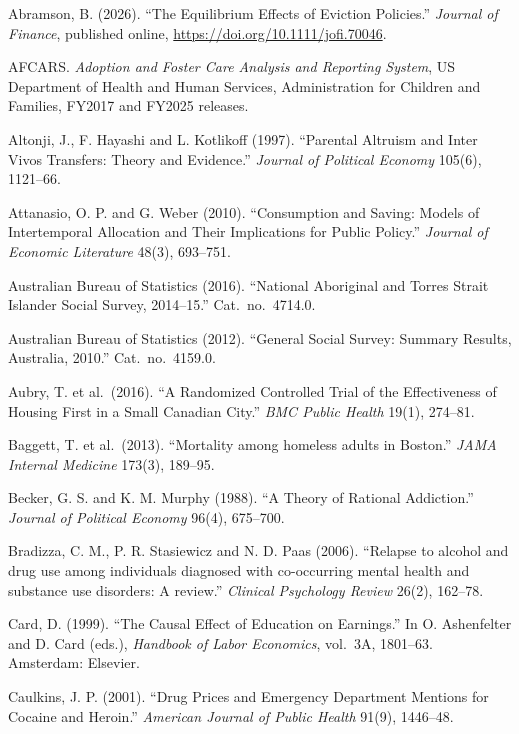 \documentclass[10pt]{article}
\begin{document}
{\normalsize
\setlength{\parindent}{0em}
\begin{list}{}{\setlength{\leftmargin}{1.5em}\setlength{\itemindent}{-1.5em}\setlength{\itemsep}{0.35em}\setlength{\parsep}{0em}}
\item Abramson, B. (2026). ``The Equilibrium Effects of Eviction Policies.'' \emph{Journal of Finance}, published online, \url{https://doi.org/10.1111/jofi.70046}.
\item AFCARS. \emph{Adoption and Foster Care Analysis and Reporting System}, US Department of Health and Human Services, Administration for Children and Families, FY2017 and FY2025 releases.
\item Altonji, J., F. Hayashi and L. Kotlikoff (1997). ``Parental Altruism and Inter Vivos Transfers: Theory and Evidence.'' \emph{Journal of Political Economy} 105(6), 1121--66.
\item Attanasio, O. P. and G. Weber (2010). ``Consumption and Saving: Models of Intertemporal Allocation and Their Implications for Public Policy.'' \emph{Journal of Economic Literature} 48(3), 693--751.
\item Australian Bureau of Statistics (2016). ``National Aboriginal and Torres Strait Islander Social Survey, 2014--15.'' Cat.\ no.\ 4714.0.
\item Australian Bureau of Statistics (2012). ``General Social Survey: Summary Results, Australia, 2010.'' Cat.\ no.\ 4159.0.
\item Aubry, T. et al.\ (2016). ``A Randomized Controlled Trial of the Effectiveness of Housing First in a Small Canadian City.'' \emph{BMC Public Health} 19(1), 274--81.
\item Baggett, T. et al.\ (2013). ``Mortality among homeless adults in Boston.'' \emph{JAMA Internal Medicine} 173(3), 189--95.
\item Becker, G. S. and K. M. Murphy (1988). ``A Theory of Rational Addiction.'' \emph{Journal of Political Economy} 96(4), 675--700.
\item Bradizza, C. M., P. R. Stasiewicz and N. D. Paas (2006). ``Relapse to alcohol and drug use among individuals diagnosed with co-occurring mental health and substance use disorders: A review.'' \emph{Clinical Psychology Review} 26(2), 162--78.
\item Card, D. (1999). ``The Causal Effect of Education on Earnings.'' In O. Ashenfelter and D. Card (eds.), \emph{Handbook of Labor Economics}, vol.\ 3A, 1801--63. Amsterdam: Elsevier.
\item Caulkins, J. P. (2001). ``Drug Prices and Emergency Department Mentions for Cocaine and Heroin.'' \emph{American Journal of Public Health} 91(9), 1446--48.

\end{list}}
\end{document}
